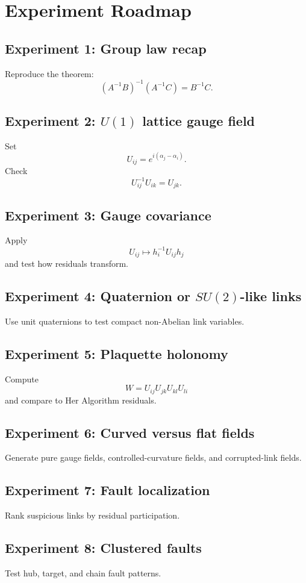 \documentclass[11pt]{article}
\newcommand{\HA}{Her Algorithm}
\begin{document}
\section{Experiment Roadmap}

\subsection{Experiment 1: Group law recap}
Reproduce the theorem:
\[
(A^{-1}B)^{-1}(A^{-1}C)=B^{-1}C.
\]

\subsection{Experiment 2: \(U(1)\) lattice gauge field}
Set
\[
U_{ij}=e^{i(\alpha_j-\alpha_i)}.
\]
Check
\[
U_{ij}^{-1}U_{ik}=U_{jk}.
\]

\subsection{Experiment 3: Gauge covariance}
Apply
\[
U_{ij}\mapsto h_i^{-1}U_{ij}h_j
\]
and test how residuals transform.

\subsection{Experiment 4: Quaternion or \(SU(2)\)-like links}
Use unit quaternions to test compact non-Abelian link variables.

\subsection{Experiment 5: Plaquette holonomy}
Compute
\[
W=U_{ij}U_{jk}U_{kl}U_{li}
\]
and compare to \HA{} residuals.

\subsection{Experiment 6: Curved versus flat fields}
Generate pure gauge fields, controlled-curvature fields, and corrupted-link fields.

\subsection{Experiment 7: Fault localization}
Rank suspicious links by residual participation.

\subsection{Experiment 8: Clustered faults}
Test hub, target, and chain fault patterns.
\end{document}
